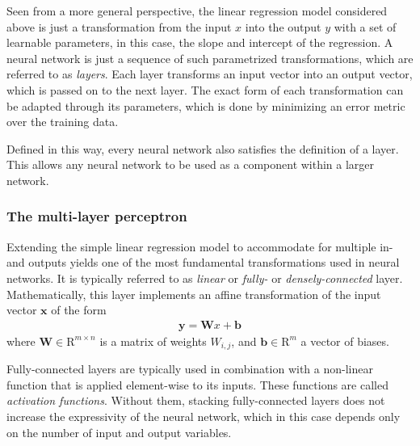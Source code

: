   Seen from a more general perspective, the linear regression model considered
  above is just a transformation from the input $x$ into the output $y$ with a
  set of learnable parameters, in this case, the slope and intercept of the
  regression. A neural network is just a sequence of such parametrized
  transformations, which are referred to as \textit{layers}. Each layer
  transforms an input vector into an output vector, which is passed on to the
  next layer. The exact form of each transformation can be adapted through its
  parameters, which is done by minimizing an error metric over the training
  data.

  Defined in this way, every neural network also satisfies the definition of a
  layer. This allows any neural network to be used as a component within a
  larger network.


  \subsubsection{The multi-layer perceptron}

  Extending the simple linear regression model to accommodate for multiple in-
  and outputs yields one of the most fundamental transformations used in neural
  networks. It is typically referred to as \textit{linear} or \textit{fully-} or
  \textit{densely-connected} layer. Mathematically, this layer implements an
  affine transformation of the input vector $\bm{x}$ of the form
  \begin{align}
    \bm{y} = \bm{W}x + \bm{b}
  \end{align}
  where $\bm{W} \in \mathrm{R}^{m \times n}$ is a matrix of weights $W_{i,j}$,
  and $\bm{b} \in \mathrm{R}^m$ a vector of  biases.

  Fully-connected layers are typically used in combination with a non-linear
  function that is applied element-wise to its inputs. These functions are
  called \textit{activation functions}. Without them, stacking fully-connected
  layers does not increase the expressivity of the neural network, which in this
  case depends only on the number of input and output variables.


